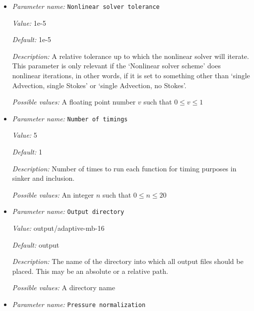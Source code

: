 \begin{itemize}
{\it Possible values:} Any one of single Advection, single Stokes, iterated Advection and Stokes, single Advection, iterated Stokes, no Advection, iterated Stokes, iterated Advection and Newton Stokes, single Advection, no Stokes, IMPES, iterated IMPES, iterated Stokes, Newton Stokes, Stokes only, Advection only, first timestep only, single Stokes, no Advection, no Stokes
\item {\it Parameter name:} {\tt Nonlinear solver tolerance}
\label{parameters:Nonlinear solver tolerance}
\label{parameters:Nonlinear_20solver_20tolerance}


{\it Value:} 1e-5


{\it Default:} 1e-5


{\it Description:} A relative tolerance up to which the nonlinear solver will iterate. This parameter is only relevant if the `Nonlinear solver scheme' does nonlinear iterations, in other words, if it is set to something other than `single Advection, single Stokes' or `single Advection, no Stokes'.


{\it Possible values:} A floating point number $v$ such that $0 \leq v \leq 1$
\item {\it Parameter name:} {\tt Number of timings}
\label{parameters:Number of timings}
\label{parameters:Number_20of_20timings}


{\it Value:} 5


{\it Default:} 1


{\it Description:} Number of times to run each function for timing purposes in sinker and inclusion.


{\it Possible values:} An integer $n$ such that $0\leq n \leq 20$
\item {\it Parameter name:} {\tt Output directory}
\label{parameters:Output directory}
\label{parameters:Output_20directory}


{\it Value:} output/adaptive-mb-16


{\it Default:} output


{\it Description:} The name of the directory into which all output files should be placed. This may be an absolute or a relative path.


{\it Possible values:} A directory name
\item {\it Parameter name:} {\tt Pressure normalization}
\label{parameters:Pressure normalization}
\label{parameters:Pressure_20normalization}



\end{itemize}
